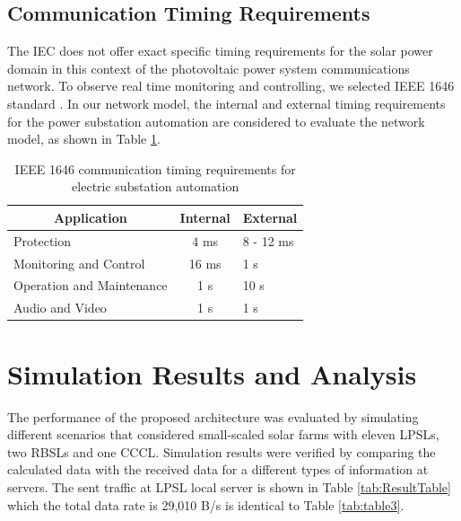 \documentclass[conference, letterpaper]{IEEEtran}
\begin{document}
\subsection{Communication Timing Requirements}
The IEC does not offer exact specific timing requirements for the solar power domain in this context of the photovoltaic power system communications network. To observe real time monitoring and controlling, we selected IEEE 1646 standard \cite{b10}. In our network model, the internal and external timing requirements for the power substation automation are considered to evaluate the network model, as shown in Table \ref{tab:table5}. 


\begin{table}[htbp]
\caption{IEEE 1646 communication timing requirements for electric substation automation}
\centering
\label{tab:table5}
\begin{tabular}{lcl}
\hline
\multicolumn{1}{c}{Application} & Internal & External  \\ \hline
Protection                      & 4 ms     & 8 - 12 ms \\
Monitoring and Control          & 16 ms    & 1 s       \\
Operation and Maintenance       & 1 s      & 10 s      \\
Audio and Video                 & 1 s      & 1 s      \\ \hline
\end{tabular}
\end{table}

\section{Simulation Results and Analysis}


The performance of the proposed architecture was evaluated by simulating different scenarios that considered small-scaled solar farms with eleven LPSLs, two RBSLs and one CCCL. Simulation results were verified by comparing the calculated data with the received data for a different types of information at servers. The sent traffic at LPSL local server is shown in Table \ref{tab:ResultTable} which the total data rate is 29,010 B/s is identical to Table \ref{tab:table3}.
\end{document}
